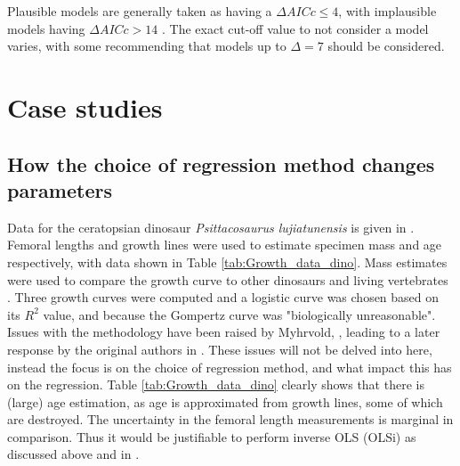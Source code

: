 \documentclass[12pt,a4paper]{article}
\begin{document}
	
	Plausible models are generally taken as having a $\Delta AICc\leq4$, with implausible models having $\Delta AICc>14$ \parencite{Burnham2011}. The exact cut-off value to not consider a model varies, with some recommending that models up to $\Delta=7$ should be considered.
\section{Case studies}
\subsection{How the choice of regression method changes parameters}
Data for the ceratopsian dinosaur \emph{Psittacosaurus lujiatunensis} is given in \textcite{Erickson2015,Erickson2009}. Femoral lengths and growth lines were used to estimate specimen mass and age respectively, with data shown in Table \ref{tab:Growth_data_dino}. Mass estimates were used to compare the growth curve to other dinosaurs and living vertebrates \textcite{Erickson2015}. Three growth curves were computed and a logistic curve was chosen based on its $R^2$ value, and because the Gompertz curve was "biologically unreasonable". Issues with the methodology have been raised by Myhrvold, \parencite{Myhrvold2015,Myhrvold2013}, leading to a later response by the original authors in \textcite{Erickson2015}. These issues will not be delved into here, instead the focus is on the choice of regression method, and what impact this has on the regression. Table \ref{tab:Growth_data_dino} clearly shows that there is (large) age estimation, as age is approximated from growth lines, some of which are destroyed. The uncertainty in the femoral length measurements is marginal in comparison. Thus it would be justifiable to perform inverse OLS (OLSi) as discussed above and in \textcite{Kaufmann1981}. 
 
\end{document}

